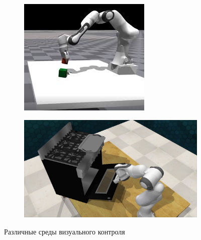 \begin{frame}
\begin{columns}[t]
\begin{column}{0.55\linewidth}
\begin{figure}
    \begin{subfigure}[c]{.45\linewidth}
        \includegraphics[width=\linewidth]{images/visual_control_envs/isaac_gym.jpeg}
    \end{subfigure}
    \hspace{1em}
    \begin{subfigure}[c]{.45\linewidth}
        \includegraphics[width=\linewidth]{images/visual_control_envs/rl_bench.jpg}
    \end{subfigure}
    \caption{Различные среды визуального контроля}
    \end{figure}
\end{column}
\end{columns}


\end{frame}
